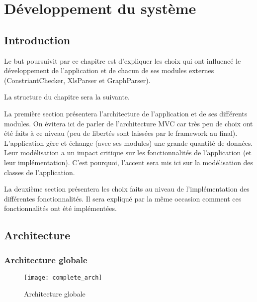\chapter{Développement du système}
\section{Introduction}
Le but poursuivit par ce chapitre est d'expliquer les choix qui ont influencé le développement de l'application et de chacun de ses modules externes (ConstriantChecker, XlsParser et GraphParser).

La structure du chapitre sera la suivante. 

La première section présentera l'architecture de l'application et de ses différents modules. On évitera ici de parler de l'architecture MVC car très peu de choix ont été faits à ce niveau  (peu de libertés sont laissées par le framework au final). L'application gère et échange (avec ses modules) une grande quantité de données. Leur modélisation a un impact critique sur les fonctionnalités de l'application (et leur implémentation). C'est pourquoi, l'accent sera mis ici sur la modélisation des classes de l'application.   

La deuxième section présentera les choix faits au niveau de l'implémentation des différentes fonctionnalités. Il sera expliqué par la même occasion comment ces fonctionnalités ont été implémentées. 


\label{developpement_system}

\section{Architecture}

\subsection{Architecture globale}

\begin{figure}
\caption{Architecture globale}
\centering
\label{fig:complete_arch}
\texttt{[image: complete\_arch]}
\end{figure}

